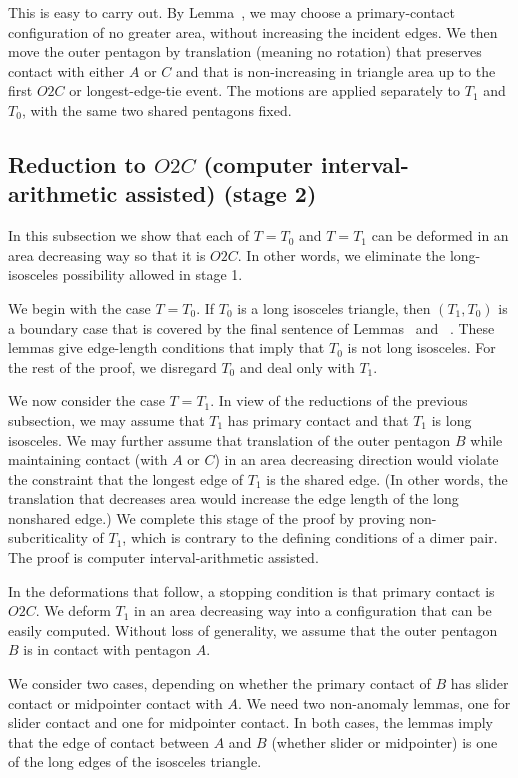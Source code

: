 This is easy to carry out. By Lemma~, we may
choose a primary-contact configuration of no greater area, without
increasing the incident edges. We then move the outer
pentagon by translation (meaning no rotation) that preserves contact
with either $A$ or $C$ and that is non-increasing in triangle area
up to the first $O2C$ or longest-edge-tie event.  The motions are
applied separately to $T_1$ and $T_0$, with the same two shared
pentagons fixed.

\subsection{Reduction to $O2C$ (computer interval-arithmetic assisted) (stage 2)}

In this subsection we show that each of $T=T_0$ and $T=T_1$ can be
deformed in an area decreasing way so that it is $O2C$.
In other words, we eliminate the long-isosceles possibility allowed in stage 1.

We begin with the case $T=T_0$.  If $T_0$ is a long isosceles
triangle, then $(T_1,T_0)$ is a boundary case that is covered by the
final sentence of Lemmas~ and ~.
These lemmas give edge-length conditions that imply that $T_0$ is not
long isosceles.  For the rest of the proof, we disregard $T_0$ and
deal only with $T_1$.

We now consider the case $T=T_1$.  In view of the reductions of the
previous subsection, we may assume that $T_1$ has primary contact and
that $T_1$ is long isosceles.  We may further assume that translation
of the outer pentagon $B$ while maintaining contact (with $A$ or $C$)
in an area decreasing direction would violate the constraint that the
longest edge of $T_1$ is the shared edge.  (In other words, the
translation that decreases area would increase the edge length of the
long nonshared edge.)  We complete this stage of the proof by proving
non-subcriticality of $T_1$, which is contrary to the defining
conditions of a dimer pair.  The proof is computer interval-arithmetic
assisted.

In the deformations that follow, a stopping condition is that
primary contact is $O2C$.
We deform $T_1$ in an area decreasing
way into a configuration that can be easily computed.  Without loss of
generality, we assume that the outer pentagon $B$ is in contact with
pentagon $A$.  

We consider two cases, depending on whether the primary contact of $B$
has slider contact or midpointer contact with $A$.  We need two
non-anomaly lemmas, one for slider contact and one for midpointer
contact.  In both cases, the lemmas imply that the edge of contact
between $A$ and $B$ (whether slider or midpointer) is one of the long
edges of the isosceles triangle.

